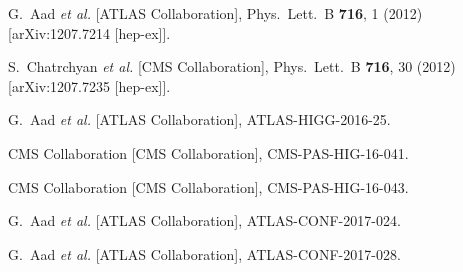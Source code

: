 \documentclass[10pt]{article}
\begin{document}
\begin{thebibliography}{99}


  G.~Aad {\it et al.}  [ATLAS Collaboration],
  Phys.\ Lett.\ B {\bf 716}, 1 (2012)
  [arXiv:1207.7214 [hep-ex]].
  
  
  S.~Chatrchyan {\it et al.}  [CMS Collaboration],
  Phys.\ Lett.\ B {\bf 716}, 30 (2012)
  [arXiv:1207.7235 [hep-ex]].


  G.~Aad {\it et al.}  [ATLAS Collaboration],
  ATLAS-HIGG-2016-25.


  CMS Collaboration [CMS Collaboration],
  CMS-PAS-HIG-16-041.


  CMS Collaboration [CMS Collaboration],
  CMS-PAS-HIG-16-043.


  G.~Aad {\it et al.}  [ATLAS Collaboration],
  ATLAS-CONF-2017-024.


  G.~Aad {\it et al.}  [ATLAS Collaboration],
  ATLAS-CONF-2017-028.


\end{thebibliography}

 
\end{document}
